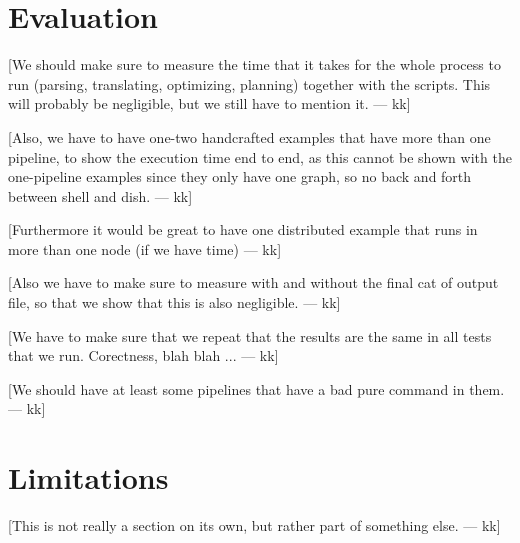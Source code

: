 \documentclass[sigplan,10pt,review,anonymous]{acmart}
\newcommand{\kk}[1]{[{\color{magenta}#1 --- kk}]}
\begin{document}
\section{Evaluation}

\kk{We should make sure to measure the time that it takes for the
  whole process to run (parsing, translating, optimizing, planning)
  together with the scripts. This will probably be negligible, but we
  still have to mention it. }

\kk{Also, we have to have one-two handcrafted examples that have more
  than one pipeline, to show the execution time end to end, as this
  cannot be shown with the one-pipeline examples since they only have
  one graph, so no back and forth between shell and dish.}

\kk{Furthermore it would be great to have one distributed example that
  runs in more than one node (if we have time)}

\kk{Also we have to make sure to measure with and without the final
  cat of output file, so that we show that this is also negligible.}

\kk{We have to make sure that we repeat that the results are the same
  in all tests that we run. Corectness, blah blah ...}

\kk{We should have at least some pipelines that have a bad pure
  command in them.}

\section{Limitations}

\kk{This is not really a section on its own, but rather part of something else.}
\end{document}

